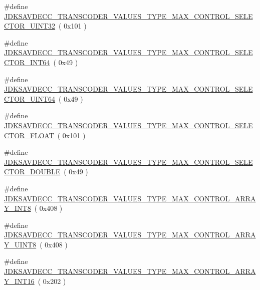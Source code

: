 \begin{DoxyCompactItemize}
\item 
\#define \hyperlink{group__transcoder__values__type__max_ga593083470a6b30f5d12b64d428ad872f}{J\+D\+K\+S\+A\+V\+D\+E\+C\+C\+\_\+\+T\+R\+A\+N\+S\+C\+O\+D\+E\+R\+\_\+\+V\+A\+L\+U\+E\+S\+\_\+\+T\+Y\+P\+E\+\_\+\+M\+A\+X\+\_\+\+C\+O\+N\+T\+R\+O\+L\+\_\+\+S\+E\+L\+E\+C\+T\+O\+R\+\_\+\+U\+I\+N\+T32}~( 0x101 )
\item 
\#define \hyperlink{group__transcoder__values__type__max_gab5c7dd3faddd5fb7bfbedc2683689389}{J\+D\+K\+S\+A\+V\+D\+E\+C\+C\+\_\+\+T\+R\+A\+N\+S\+C\+O\+D\+E\+R\+\_\+\+V\+A\+L\+U\+E\+S\+\_\+\+T\+Y\+P\+E\+\_\+\+M\+A\+X\+\_\+\+C\+O\+N\+T\+R\+O\+L\+\_\+\+S\+E\+L\+E\+C\+T\+O\+R\+\_\+\+I\+N\+T64}~( 0x49 )
\item 
\#define \hyperlink{group__transcoder__values__type__max_ga3415e8cd654ae26e57b02eeade366fb8}{J\+D\+K\+S\+A\+V\+D\+E\+C\+C\+\_\+\+T\+R\+A\+N\+S\+C\+O\+D\+E\+R\+\_\+\+V\+A\+L\+U\+E\+S\+\_\+\+T\+Y\+P\+E\+\_\+\+M\+A\+X\+\_\+\+C\+O\+N\+T\+R\+O\+L\+\_\+\+S\+E\+L\+E\+C\+T\+O\+R\+\_\+\+U\+I\+N\+T64}~( 0x49 )
\item 
\#define \hyperlink{group__transcoder__values__type__max_ga4312f6335200a33ecf46e557357908f8}{J\+D\+K\+S\+A\+V\+D\+E\+C\+C\+\_\+\+T\+R\+A\+N\+S\+C\+O\+D\+E\+R\+\_\+\+V\+A\+L\+U\+E\+S\+\_\+\+T\+Y\+P\+E\+\_\+\+M\+A\+X\+\_\+\+C\+O\+N\+T\+R\+O\+L\+\_\+\+S\+E\+L\+E\+C\+T\+O\+R\+\_\+\+F\+L\+O\+AT}~( 0x101 )
\item 
\#define \hyperlink{group__transcoder__values__type__max_ga6b064b8a4a6dae07fb130afb98f707a0}{J\+D\+K\+S\+A\+V\+D\+E\+C\+C\+\_\+\+T\+R\+A\+N\+S\+C\+O\+D\+E\+R\+\_\+\+V\+A\+L\+U\+E\+S\+\_\+\+T\+Y\+P\+E\+\_\+\+M\+A\+X\+\_\+\+C\+O\+N\+T\+R\+O\+L\+\_\+\+S\+E\+L\+E\+C\+T\+O\+R\+\_\+\+D\+O\+U\+B\+LE}~( 0x49 )
\item 
\#define \hyperlink{group__transcoder__values__type__max_gae6bd1239585509d0ff67496d449ba03d}{J\+D\+K\+S\+A\+V\+D\+E\+C\+C\+\_\+\+T\+R\+A\+N\+S\+C\+O\+D\+E\+R\+\_\+\+V\+A\+L\+U\+E\+S\+\_\+\+T\+Y\+P\+E\+\_\+\+M\+A\+X\+\_\+\+C\+O\+N\+T\+R\+O\+L\+\_\+\+A\+R\+R\+A\+Y\+\_\+\+I\+N\+T8}~( 0x408 )
\item 
\#define \hyperlink{group__transcoder__values__type__max_ga8df6e79960983dfded7b44b5a7c0e7f5}{J\+D\+K\+S\+A\+V\+D\+E\+C\+C\+\_\+\+T\+R\+A\+N\+S\+C\+O\+D\+E\+R\+\_\+\+V\+A\+L\+U\+E\+S\+\_\+\+T\+Y\+P\+E\+\_\+\+M\+A\+X\+\_\+\+C\+O\+N\+T\+R\+O\+L\+\_\+\+A\+R\+R\+A\+Y\+\_\+\+U\+I\+N\+T8}~( 0x408 )
\item 
\#define \hyperlink{group__transcoder__values__type__max_ga1675dcc5974e941f5375ec50d74c98ba}{J\+D\+K\+S\+A\+V\+D\+E\+C\+C\+\_\+\+T\+R\+A\+N\+S\+C\+O\+D\+E\+R\+\_\+\+V\+A\+L\+U\+E\+S\+\_\+\+T\+Y\+P\+E\+\_\+\+M\+A\+X\+\_\+\+C\+O\+N\+T\+R\+O\+L\+\_\+\+A\+R\+R\+A\+Y\+\_\+\+I\+N\+T16}~( 0x202 )

\end{DoxyCompactItemize}
